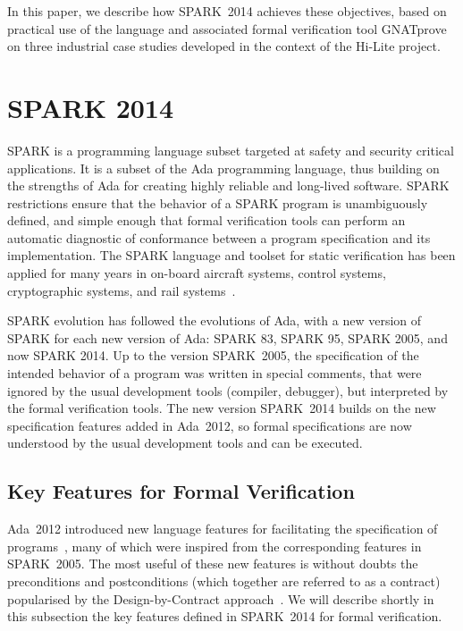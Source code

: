 \documentclass[10pt,a4paper,twocolumn]{article}
\newcommand{\hilite}{Hi-Lite\xspace}
\newcommand{\gnatprove}{GNATprove\xspace}
\newcommand{\oldspark}{SPARK~2005\xspace}
\newcommand{\newspark}{SPARK~2014\xspace}
\newcommand{\adatwtw}{Ada~2012\xspace}
\begin{document}
In this paper, we describe how \newspark achieves these objectives, based on
practical use of the language and associated formal verification tool
\gnatprove on three industrial case studies developed in the context of the
\hilite project.

\section{SPARK 2014}


SPARK is a programming language subset targeted at safety and security critical
applications. It is a subset of the Ada programming language, thus building on
the strengths of Ada for creating highly reliable and long-lived
software. SPARK restrictions ensure that the behavior of a SPARK program is
unambiguously defined, and simple enough that formal verification tools can
perform an automatic diagnostic of conformance between a program specification
and its implementation. The SPARK language and toolset for static verification
has been applied for many years in on-board aircraft systems, control systems,
cryptographic systems, and rail systems~\cite{sparkbook2012,oneill2012}.

SPARK evolution has followed the evolutions of Ada, with a new version of SPARK
for each new version of Ada: SPARK 83, SPARK 95, SPARK 2005, and now SPARK
2014. Up to the version \oldspark, the specification of the intended behavior
of a program was written in special comments, that were ignored by the usual
development tools (compiler, debugger), but interpreted by the formal
verification tools. The new version \newspark builds on the new specification
features added in \adatwtw, so formal specifications are now understood by the
usual development tools and can be executed.

\subsection{Key Features for Formal Verification}

\adatwtw introduced new language features for facilitating the specification of
programs~\cite{ada2012rationale}, many of which were inspired from the
corresponding features in \oldspark. The most useful of these new features is
without doubts the preconditions and postconditions (which together are
referred to as a contract) popularised by the Design-by-Contract
approach~\cite{meyer:1988:OSC}.
We will
describe shortly in this subsection the key features defined in \newspark for
formal verification.
\end{document}
